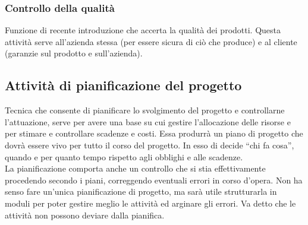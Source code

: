 \subsubsection{Controllo della qualità}
Funzione di recente introduzione che accerta la qualità dei prodotti. Questa attività serve all'azienda stessa (per essere sicura di ciò che produce) e al cliente (garanzie sul prodotto e sull'azienda).

\subsection{Attività di pianificazione del progetto}
Tecnica che consente di pianificare lo svolgimento del progetto e controllarne l'attuazione, serve per avere una base su cui gestire l'allocazione delle risorse e per stimare e controllare scadenze e costi. Essa produrrà un piano di progetto che dovrà essere vivo per tutto il corso del progetto. In esso di decide ``chi fa cosa'', quando e per quanto tempo rispetto agli obblighi e alle scadenze. \\
La pianificazione comporta anche un controllo che si stia effettivamente procedendo secondo i piani, correggendo eventuali errori in corso d'opera. Non ha senso fare un'unica pianificazione di progetto, ma sarà utile strutturarla in moduli per poter gestire meglio le attività ed arginare gli errori. Va detto che le attività non possono deviare dalla pianifica. 

